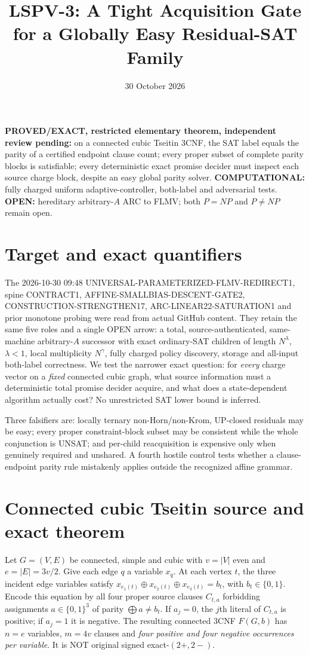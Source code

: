 \documentclass[11pt]{article}
\title{LSPV-3: A Tight Acquisition Gate for a Globally Easy Residual-SAT Family}
\date{30 October 2026}
\begin{document}
\maketitle

\noindent\textbf{PROVED/EXACT, restricted elementary theorem, independent review pending:}
on a connected cubic Tseitin 3CNF, the SAT label equals the parity of a certified endpoint clause count; every proper subset of complete parity blocks is satisfiable; every deterministic exact promise decider must inspect each source charge block, despite an easy global parity solver. \textbf{COMPUTATIONAL:} fully charged uniform adaptive-controller, both-label and adversarial tests. \textbf{OPEN:} hereditary arbitrary-$A$ ARC to FLMV; both $P=NP$ and $P\ne NP$ remain open.

\section{Target and exact quantifiers}
The 2026-10-30 09:48 UNIVERSAL-PARAMETERIZED-FLMV-REDIRECT1, spine CONTRACT1, AFFINE-SMALLBIAS-DESCENT-GATE2, CONSTRUCTION-STRENGTHEN17, ARC-LINEAR22-SATURATION1 and prior monotone probing were read from actual GitHub content. They retain the same five roles and a single OPEN arrow: a total, source-authenticated, same-machine arbitrary-$A$ successor with exact ordinary-SAT children of length $N^\lambda$, $\lambda<1$, local multiplicity $N^\gamma$, fully charged policy discovery, storage and all-input both-label correctness. We test the narrower exact question: for \emph{every} charge vector on a \emph{fixed} connected cubic graph, what source information must a deterministic total promise decider acquire, and what does a state-dependent algorithm actually cost? No unrestricted SAT lower bound is inferred.

Three falsifiers are: locally ternary non-Horn/non-Krom, UP-closed residuals may be easy; every proper constraint-block subset may be consistent while the whole conjunction is UNSAT; and per-child reacquisition is expensive only when genuinely required and unshared. A fourth hostile control tests whether a clause-endpoint parity rule mistakenly applies outside the recognized affine grammar.

\section{Connected cubic Tseitin source and exact theorem}
Let $G=(V,E)$ be connected, simple and cubic with $v=|V|$ even and $e=|E|=3v/2$. Give each edge $q$ a variable $x_q$. At each vertex $t$, the three incident edge variables satisfy $x_{e_1(t)}\oplus x_{e_2(t)}\oplus x_{e_3(t)}=b_t$, with $b_t\in\{0,1\}$. Encode this equation by all four proper source clauses $C_{t,a}$ forbidding assignments $a\in\{0,1\}^3$ of parity $\bigoplus a\ne b_t$. If $a_j=0$, the $j$th literal of $C_{t,a}$ is positive; if $a_j=1$ it is negative. The resulting connected 3CNF $F(G,b)$ has $n=e$ variables, $m=4v$ clauses and \emph{four positive and four negative occurrences per variable}. It is NOT original signed exact-$(2+,2-)$.
\end{document}
